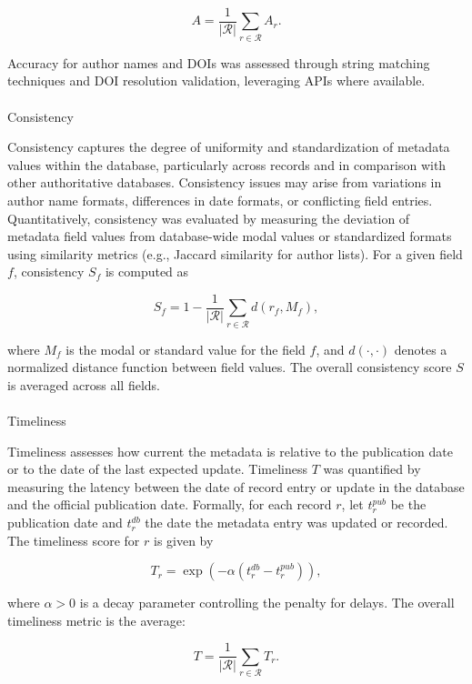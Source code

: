\documentclass[
  12pt,
]{article}
\makeatletter
\let\oldparagraph\paragraph
\renewcommand{\paragraph}{
    \@ifstar
      \xxxParagraphStar
      \xxxParagraphNoStar
  }
\newcommand{\xxxParagraphStar}[1]{\oldparagraph*{#1}\mbox{}}
\newcommand{\xxxParagraphNoStar}[1]{\oldparagraph{#1}\mbox{}}
\makeatother
\begin{document}
\[
A = \frac{1}{|\mathcal{R}|} \sum_{r \in \mathcal{R}} A_r.
\]

Accuracy for author names and DOIs was assessed through string matching
techniques and DOI resolution validation, leveraging APIs where
available.

\paragraph{Consistency}\label{consistency}

Consistency captures the degree of uniformity and standardization of
metadata values within the database, particularly across records and in
comparison with other authoritative databases. Consistency issues may
arise from variations in author name formats, differences in date
formats, or conflicting field entries. Quantitatively, consistency was
evaluated by measuring the deviation of metadata field values from
database-wide modal values or standardized formats using similarity
metrics (e.g., Jaccard similarity for author lists). For a given field
\(f\), consistency \(S_f\) is computed as

\[
S_f = 1 - \frac{1}{|\mathcal{R}|} \sum_{r \in \mathcal{R}} d(r_f, M_f),
\]

where \(M_f\) is the modal or standard value for the field \(f\), and
\(d(\cdot, \cdot)\) denotes a normalized distance function between field
values. The overall consistency score \(S\) is averaged across all
fields.

\paragraph{Timeliness}\label{timeliness}

Timeliness assesses how current the metadata is relative to the
publication date or to the date of the last expected update. Timeliness
\(T\) was quantified by measuring the latency between the date of record
entry or update in the database and the official publication date.
Formally, for each record \(r\), let \(t_r^{pub}\) be the publication
date and \(t_r^{db}\) the date the metadata entry was updated or
recorded. The timeliness score for \(r\) is given by

\[
T_r = \exp\left(-\alpha (t_r^{db} - t_r^{pub})\right),
\]

where \(\alpha > 0\) is a decay parameter controlling the penalty for
delays. The overall timeliness metric is the average:

\[
T = \frac{1}{|\mathcal{R}|} \sum_{r \in \mathcal{R}} T_r.
\]
\end{document}
